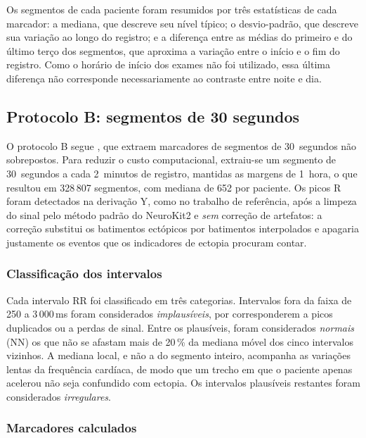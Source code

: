 Os segmentos de cada paciente foram resumidos por três estatísticas de cada
marcador: a mediana, que descreve seu nível típico; o desvio-padrão, que
descreve sua variação ao longo do registro; e a diferença entre as médias do
primeiro e do último terço dos segmentos, que aproxima a variação entre o
início e o fim do registro. Como o horário de início dos exames não foi
utilizado, essa última diferença não corresponde necessariamente ao
contraste entre noite e dia.

\subsection{Protocolo B: segmentos de 30 segundos}
\label{subsec:met-protocolo-b}

O protocolo B segue , que extraem marcadores de
segmentos de 30~segundos não sobrepostos. Para reduzir o custo
computacional, extraiu-se um segmento de 30~segundos a cada 2~minutos de
registro, mantidas as margens de 1~hora, o que resultou em 328\,807
segmentos, com mediana de 652 por paciente. Os picos R foram detectados na
derivação Y, como no trabalho de referência, após a limpeza do sinal pelo
método padrão do NeuroKit2 e \textit{sem} correção de artefatos: a correção
substitui os batimentos ectópicos por batimentos interpolados e apagaria
justamente os eventos que os indicadores de ectopia procuram contar.

\subsubsection{Classificação dos intervalos}

Cada intervalo RR foi classificado em três categorias. Intervalos fora da
faixa de 250 a 3\,000\,ms foram considerados \textit{implausíveis}, por
corresponderem a picos duplicados ou a perdas de sinal. Entre os plausíveis,
foram considerados \textit{normais} (NN) os que não se afastam mais de
20\,\% da mediana móvel dos cinco intervalos vizinhos. A mediana local, e
não a do segmento inteiro, acompanha as variações lentas da frequência
cardíaca, de modo que um trecho em que o paciente apenas acelerou não seja
confundido com ectopia. Os intervalos plausíveis restantes foram
considerados \textit{irregulares}.

\subsubsection{Marcadores calculados}


